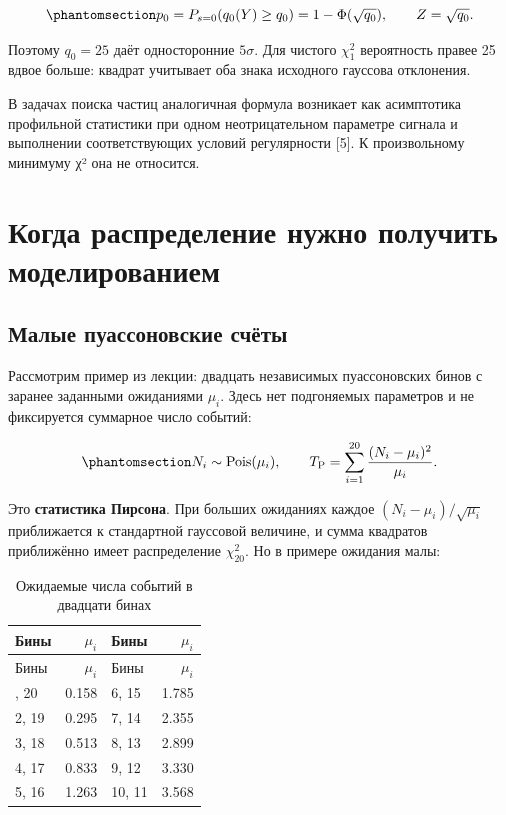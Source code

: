 \documentclass[
  russian,
  11pt,
  a4paper,
  open=any]{scrbook}
\begin{document}
\begin{equation}\protect\phantomsection\label{eq-ch13-discovery-significance}{
p_0=P_{s=0}(q_0(Y)\ge q_0)
=1-\Phi(\sqrt{q_0}),
\qquad Z=\sqrt{q_0}.
}\end{equation}

Поэтому \(q_0=25\) даёт односторонние \(5\sigma\). Для чистого
\(\chi^2_1\) вероятность правее 25 вдвое больше: квадрат учитывает оба
знака исходного гауссова отклонения.

В задачах поиска частиц аналогичная формула возникает как асимптотика
профильной статистики при одном неотрицательном параметре сигнала и
выполнении соответствующих условий регулярности {[}5{]}. К произвольному
минимуму χ² она не относится.

\section{Когда распределение нужно получить
моделированием}\label{ux43aux43eux433ux434ux430-ux440ux430ux441ux43fux440ux435ux434ux435ux43bux435ux43dux438ux435-ux43dux443ux436ux43dux43e-ux43fux43eux43bux443ux447ux438ux442ux44c-ux43cux43eux434ux435ux43bux438ux440ux43eux432ux430ux43dux438ux435ux43c}

\subsection{Малые пуассоновские
счёты}\label{ux43cux430ux43bux44bux435-ux43fux443ux430ux441ux441ux43eux43dux43eux432ux441ux43aux438ux435-ux441ux447ux451ux442ux44b}

Рассмотрим пример из лекции: двадцать независимых пуассоновских бинов с
заранее заданными ожиданиями \(\mu_i\). Здесь нет подгоняемых параметров
и не фиксируется суммарное число событий:

\begin{equation}\protect\phantomsection\label{eq-ch13-pearson-statistic}{
N_i\sim\operatorname{Pois}(\mu_i),
\qquad
T_{\mathrm P}=\sum_{i=1}^{20}\frac{(N_i-\mu_i)^2}{\mu_i}.
}\end{equation}

Это \textbf{статистика Пирсона}. При больших ожиданиях каждое
\((N_i-\mu_i)/\sqrt{\mu_i}\) приближается к стандартной гауссовой
величине, и сумма квадратов приближённо имеет распределение
\(\chi^2_{20}\). Но в примере ожидания малы:

\begin{longtable}[]{@{}lrlr@{}}
\caption{Ожидаемые числа событий в двадцати
бинах}\label{tbl-ch13-small-poisson-means}\tabularnewline
\toprule\noalign{}
Бины & \(\mu_i\) & Бины & \(\mu_i\) \\
\midrule\noalign{}
\endfirsthead
\toprule\noalign{}
Бины & \(\mu_i\) & Бины & \(\mu_i\) \\
\midrule\noalign{}
\endhead
\bottomrule\noalign{}
\endlastfoot
1, 20 & 0.158 & 6, 15 & 1.785 \\
2, 19 & 0.295 & 7, 14 & 2.355 \\
3, 18 & 0.513 & 8, 13 & 2.899 \\
4, 17 & 0.833 & 9, 12 & 3.330 \\
5, 16 & 1.263 & 10, 11 & 3.568 \\
\end{longtable}
\end{document}
